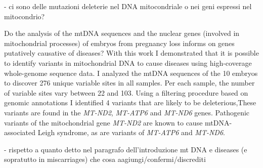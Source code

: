 
- ci sono delle mutazioni deleterie nel DNA mitocondriale o nei geni espressi nel mitocondrio?

Do the analysis of the mtDNA sequences and the nuclear genes (involved in mitochondrial processes) of embryos from pregnancy loss informs on genes putatively causative of diseases?
 With this work I demonstrated that it is possible to identify variants in mitochondrial DNA to cause diseases using high-coverage whole-genome sequence data.
 I analyzed the mtDNA sequences of the 10 embryos to discover 276 unique variable sites in all samples. Per each sample, the number of variable sites vary between 22 and 103. Using a filtering procedure  based on genomic annotations I identified 4 variants that are likely to be deleterious,These variants are found in the \textit {MT-ND2}, \textit{MT-ATP6} and \textit{MT-ND6} genes. 
Pathogenic variants of the mitochondrial gene \textit{MT-ND2} are known to cause mtDNA-associated Leigh syndrome, as are variants of \textit{MT-ATP6} and \textit{MT-ND6}. 




- rispetto  a quanto detto nel paragrafo dell'introduzione mt DNA e diseases (e sopratutto in miscarriages) che cosa aagiungi/confermi/discrediti 







